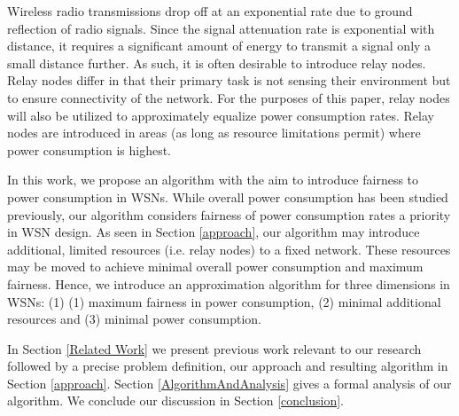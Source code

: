 Wireless radio transmissions drop off at an exponential rate due to ground reflection of radio signals. Since the signal attenuation rate is exponential with distance, it requires a significant amount of energy to transmit a signal only a small distance further. As such, it is often desirable to introduce relay nodes. Relay nodes differ in that their primary task is not sensing their environment but to ensure connectivity of the network. For the purposes of this paper, relay nodes will also be utilized to approximately equalize power consumption rates. Relay nodes are introduced in areas (as long as resource limitations permit) where power consumption is highest.

In this work, we propose an algorithm with the aim to introduce fairness to power consumption in WSNs. While overall power consumption has been studied previously, our algorithm considers fairness of power consumption rates a priority in WSN design. As seen in Section \ref{approach}, our algorithm may introduce additional, limited resources (i.e. relay nodes) to a fixed network. These resources may be moved to achieve minimal overall power consumption and maximum fairness. Hence, we introduce an approximation algorithm for three dimensions in WSNs: (1) (1) maximum fairness in power consumption, (2) minimal additional resources and (3) minimal power consumption.

In Section \ref{Related Work} we present previous work relevant to our research followed by a precise problem definition, our approach and resulting algorithm in Section \ref{approach}. Section \ref{AlgorithmAndAnalysis} gives a formal analysis of our algorithm. We conclude our discussion in Section \ref{conclusion}.

